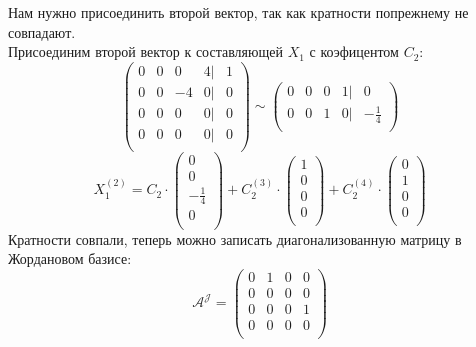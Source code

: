 \documentclass{article}
\begin{document}
Нам нужно присоединить второй вектор, так как кратности попрежнему не совпадают.\\
Присоединим второй вектор к составляющей $X_1$ с коэфицентом $C_2$:
\begin{equation*}
    \begin{pmatrix}
        0 & 0 & 0 & 4|&1 \\
        0 & 0 & -4 & 0|&0 \\
        0 & 0 & 0 & 0|&0 \\
        0 & 0 & 0 & 0|&0 \\
        \end{pmatrix}\sim 
        \begin{pmatrix}
            0 & 0 & 0 & 1|& 0\\
            0 & 0 & 1 & 0|&-\frac{1}{4} \\
        \end{pmatrix}
\end{equation*}
\begin{equation*}
    X^{(2)}_1=C_2\cdot 
    \begin{pmatrix}
        0 \\
        0 \\
        -\frac{1}{4} \\
        0 \\
    \end{pmatrix}+
    C^{(3)}_2\cdot 
    \begin{pmatrix}
        1 \\
        0 \\
        0 \\
        0 \\
    \end{pmatrix}+
    C^{(4)}_2\cdot 
    \begin{pmatrix}
        0 \\
        1 \\
        0 \\
        0 \\
    \end{pmatrix}
\end{equation*}
Кратности совпали, теперь можно записать диагонализованную матрицу в Жордановом базисе:\\
\begin{equation*}\mathcal{A}^{\mathcal{J} } =
    \begin{pmatrix}
        0 & 1 & 0 & 0 \\
        0 & 0 & 0 & 0 \\
        0 & 0 & 0 & 1 \\
        0 & 0 & 0 & 0 \\
        \end{pmatrix}
\end{equation*}
\end{document}
